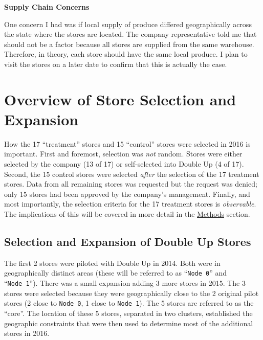 \documentclass[12pt,letterpaperpaper,]{book}
\begin{document}
\textbf{Supply Chain Concerns}

One concern I had was if local supply of produce differed geographically
across the state where the stores are located. The company
representative told me that should not be a factor because all stores
are supplied from the same warehouse. Therefore, in theory, each store
should have the same local produce. I plan to visit the stores on a
later date to confirm that this is actually the case.

\hypertarget{store-selection-1}{\section*{Overview of Store Selection
and Expansion}\label{store-selection-1}}

How the 17 ``treatment'' stores and 15 ``control'' stores were selected
in 2016 is important. First and foremost, selection was \emph{not}
random. Stores were either selected by the company (13 of 17) or
self-selected into Double Up (4 of 17). Second, the 15 control stores
were selected \emph{after} the selection of the 17 treatment stores.
Data from all remaining stores was requested but the request was denied;
only 15 stores had been approved by the company's management. Finally,
and most importantly, the selection criteria for the 17 treatment stores
is \emph{observable}. The implications of this will be covered in more
detail in the \protect\hyperlink{methods}{Methods} section.

\subsection*{Selection and Expansion of Double Up
Stores}\label{selection-and-expansion-of-double-up-stores}

The first 2 stores were piloted with Double Up in 2014. Both were in
geographically distinct areas (these will be referred to as
``\texttt{Node\ 0}'' and ``\texttt{Node\ 1}''). There was a small
expansion adding 3 more stores in 2015. The 3 stores were selected
because they were geographically close to the 2 original pilot stores (2
close to \texttt{Node\ 0}, 1 close to \texttt{Node\ 1}). The 5 stores
are referred to as the ``core''. The location of these 5 stores,
separated in two clusters, established the geographic constraints that
were then used to determine most of the additional stores in 2016.
\end{document}
